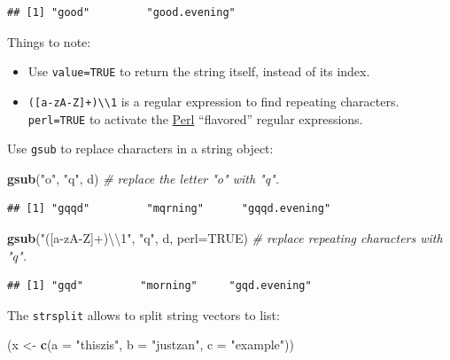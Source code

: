 \documentclass[]{book}
\newenvironment{Shaded}{\begin{snugshade}}{\end{snugshade}}
\newcommand{\KeywordTok}[1]{\textcolor[rgb]{0.13,0.29,0.53}{\textbf{#1}}}
\newcommand{\DataTypeTok}[1]{\textcolor[rgb]{0.13,0.29,0.53}{#1}}
\newcommand{\CharTok}[1]{\textcolor[rgb]{0.31,0.60,0.02}{#1}}
\newcommand{\StringTok}[1]{\textcolor[rgb]{0.31,0.60,0.02}{#1}}
\newcommand{\CommentTok}[1]{\textcolor[rgb]{0.56,0.35,0.01}{\textit{#1}}}
\newcommand{\OtherTok}[1]{\textcolor[rgb]{0.56,0.35,0.01}{#1}}
\newcommand{\NormalTok}[1]{#1}
\providecommand{\tightlist}{%
  \setlength{\itemsep}{0pt}\setlength{\parskip}{0pt}}
\theoremstyle{definition}
\theoremstyle{definition}
\theoremstyle{definition}
\theoremstyle{remark}
\begin{document}
\begin{verbatim}
## [1] "good"         "good.evening"
\end{verbatim}

Things to note:

\begin{itemize}
\tightlist
\item
  Use \texttt{value=TRUE} to return the string itself, instead of its
  index.
\item
  \texttt{({[}a-zA-Z{]}+)\textbackslash{}\textbackslash{}1} is a regular
  expression to find repeating characters. \texttt{perl=TRUE} to
  activate the \href{https://en.wikipedia.org/wiki/Perl}{Perl}
  ``flavored'' regular expressions.
\end{itemize}

Use \texttt{gsub} to replace characters in a string object:

\begin{Shaded}
\begin{Highlighting}[]
\KeywordTok{gsub}\NormalTok{(}\StringTok{"o"}\NormalTok{, }\StringTok{"q"}\NormalTok{, d) }\CommentTok{# replace the letter "o" with "q".}
\end{Highlighting}
\end{Shaded}

\begin{verbatim}
## [1] "gqqd"         "mqrning"      "gqqd.evening"
\end{verbatim}

\begin{Shaded}
\begin{Highlighting}[]
\KeywordTok{gsub}\NormalTok{(}\StringTok{"([a-zA-Z]+)}\CharTok{\textbackslash{}\textbackslash{}}\StringTok{1"}\NormalTok{, }\StringTok{"q"}\NormalTok{, d, }\DataTypeTok{perl=}\OtherTok{TRUE}\NormalTok{) }\CommentTok{# replace repeating characters with "q".}
\end{Highlighting}
\end{Shaded}

\begin{verbatim}
## [1] "gqd"         "morning"     "gqd.evening"
\end{verbatim}

The \texttt{strsplit} allows to split string vectors to list:

\begin{Shaded}
\begin{Highlighting}[]
\NormalTok{(x <-}\StringTok{ }\KeywordTok{c}\NormalTok{(}\DataTypeTok{a =} \StringTok{"thiszis"}\NormalTok{, }\DataTypeTok{b =} \StringTok{"justzan"}\NormalTok{, }\DataTypeTok{c =} \StringTok{"example"}\NormalTok{))}
\end{Highlighting}
\end{Shaded}
\end{document}

